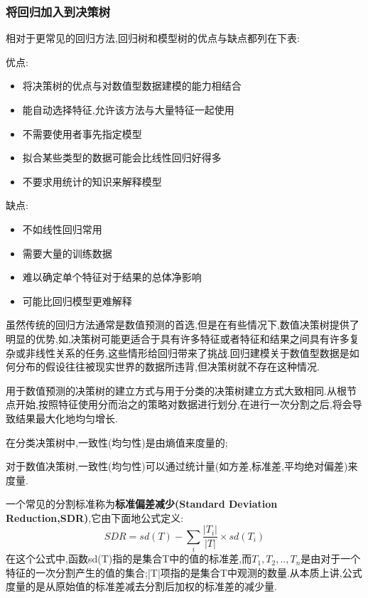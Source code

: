 \documentclass[11pt,a4paper,oneside]{book}
\begin{document}
\subsubsection{将回归加入到决策树}
相对于更常见的回归方法,回归树和模型树的优点与缺点都列在下表:
\begin{tcolorbox}[colback=pink!10!white,colframe=pink!100!black]
优点:
\begin{itemize}
	\item 将决策树的优点与对数值型数据建模的能力相结合
	\item 能自动选择特征,允许该方法与大量特征一起使用
	\item 不需要使用者事先指定模型
	\item 拟合某些类型的数据可能会比线性回归好得多
	\item 不要求用统计的知识来解释模型
\end{itemize}
\end{tcolorbox}
\begin{tcolorbox}[colback=pink!10!white,colframe=pink!100!black]
缺点:
\begin{itemize}
	\item 不如线性回归常用
	\item 需要大量的训练数据
	\item 难以确定单个特征对于结果的总体净影响
	\item 可能比回归模型更难解释
\end{itemize}
\end{tcolorbox}

虽然传统的回归方法通常是数值预测的首选,但是在有些情况下,数值决策树提供了明显的优势,如,决策树可能更适合于具有许多特征或者特征和结果之间具有许多复杂或非线性关系的任务,这些情形给回归带来了挑战.回归建模关于数值型数据是如何分布的假设往往被现实世界的数据所违背,但决策树就不存在这种情况.

用于数值预测的决策树的建立方式与用于分类的决策树建立方式大致相同.从根节点开始,按照特征使用分而治之的策略对数据进行划分,在进行一次分割之后,将会导致结果最大化地均匀增长.

在分类决策树中,一致性(均匀性)是由熵值来度量的;

对于数值决策树,一致性(均匀性)可以通过统计量(如方差,标准差,平均绝对偏差)来度量.

一个常见的分割标准称为\textbf{标准偏差减少(Standard Deviation Reduction,SDR)},它由下面地公式定义:
\begin{equation}
SDR=sd(T)-\sum_{i}\frac{|T_i|}{|T|}\times sd(T_i)
\end{equation}
在这个公式中,函数sd(T)指的是集合T中的值的标准差,而$T_1,T_2,..,T_n$是由对于一个特征的一次分割产生的值的集合;|T|项指的是集合T中观测的数量.从本质上讲,公式度量的是从原始值的标准差减去分割后加权的标准差的减少量.
\end{document}
